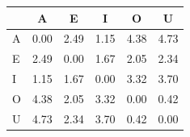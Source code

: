 \begin{tabular}{lccccc}
\toprule
\rowcolor{col01}
 & A & E & I & O & U \\
\midrule
A & 0.00 & 2.49 & 1.15 & 4.38 & 4.73 \\
E & 2.49 & 0.00 & 1.67 & 2.05 & 2.34 \\
I & 1.15 & 1.67 & 0.00 & 3.32 & 3.70 \\
O & 4.38 & 2.05 & 3.32 & 0.00 & 0.42 \\
U & 4.73 & 2.34 & 3.70 & 0.42 & 0.00 \\
\bottomrule
\end{tabular}
